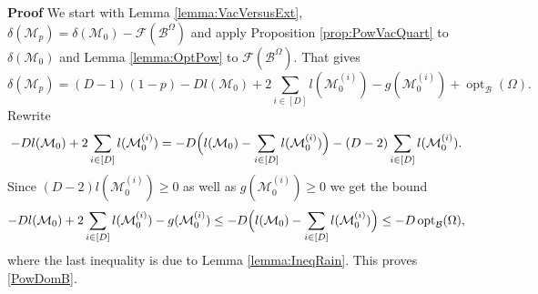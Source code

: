 \documentclass[aps,prd,10pt,notitlepage,nofootinbib,superscriptaddress,showkeys,showpacs]{revtex4-1}
\begin{document}
{{\noindent \bf Proof\; \; }} We start with Lemma \ref{lemma:VacVersusExt}, $\delta({\mathcal{M}}_p) = \delta({\mathcal{M}}_0) - {\mathcal{F}}({\mathcal{B}}^\Omega)$ and apply Proposition \ref{prop:PowVacQuart} to $\delta({\mathcal{M}}_0)$ and Lemma \ref{lemma:OptPow} to ${\mathcal{F}}({\mathcal{B}}^\Omega)$. That gives
\begin{equation}
\delta({\mathcal{M}}_p) = (D-1)(1-p) -D l({\mathcal{M}}_0) + 2 \sum_{i\in [D]} l({\mathcal{M}}_0^{(i)}) - g({\mathcal{M}}_0^{(i)}) + \operatorname{opt}_{\mathcal{B}}(\Omega).
\end{equation}
Rewrite
\begin{equation}
-D l({\mathcal{M}}_0) + 2 \sum_{i\in [D]} l({\mathcal{M}}_0^{(i)}) = -D\Bigl( l({\mathcal{M}}_0) - \sum_{i\in [D]} l({\mathcal{M}}_0^{(i)})\Bigr) - (D-2) \sum_{i\in [D]} l({\mathcal{M}}_0^{(i)}).
\end{equation}
Since $(D-2) l({\mathcal{M}}_0^{(i)}) \geq0$ as well as $g({\mathcal{M}}_0^{(i)}) \geq0$ we get the bound
\begin{equation}
-D l({\mathcal{M}}_0) + 2 \sum_{i\in [D]} l({\mathcal{M}}_0^{(i)}) - g({\mathcal{M}}_0^{(i)}) \leq -D\Bigl( l({\mathcal{M}}_0) - \sum_{i\in [D]} l({\mathcal{M}}_0^{(i)})\Bigr) \leq -D \operatorname{opt}_{\mathcal{B}}(\Omega),
\end{equation}
where the last inequality is due to Lemma \ref{lemma:IneqRain}. This proves \eqref{PowDomB}.
\end{document}
